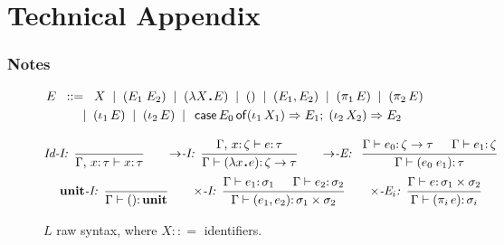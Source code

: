 \documentclass[envcountsame]{llncs}
\newcommand{\key}[1]{\ensuremath{\mathop{\mathsf{#1}}\nolimits}\xspace}
\newcommand{\Case}{\key{case}}
\newcommand{\Of}{\key{of}}
\newcommand{\Unit}{\ensuremath{\mathbf{unit}}\xspace}
\newcommand{\inj}{\mathop{\iota}\nolimits}
\newcommand{\proj}{\mathop{\pi}\nolimits}
\newcommand{\entails}{\vdash}
\newcommand{\sqdot}{\rule{0.5mm}{0.5mm}}
\newcommand{\lam}[1]{\lambda #1\,\sqdot\,}
\newcommand{\is}{\ensuremath{\mathrel{\mathrel{:}\mathrel{:}=}}}
\newcommand{\synsep}{\;\;|\;\;}
\newcommand{\of}{\colon}
\renewcommand{\colon}{\mathpunct{:}}
\newcommand{\Quad}[1]{\hspace*{#1em}}
\newcommand{\irule}[2]{\ensuremath{{\frac{\strut\textstyle #1}{\strut\textstyle #2}}}}
\newcommand{\rulelabel}[1]{\hbox{\it #1:}\Quad{0.5}}
\begin{document}
\newpage
\appendix
\section*{Technical Appendix}

\setcounter{figure}{0}
\renewcommand{\thefigure}{A.\arabic{figure}}
\setcounter{theorem}{0}
\renewcommand{\thetheorem}{A.\arabic{theorem}}
\setcounter{lemma}{0}
\renewcommand{\thelemma}{A.\arabic{lemma}}



\subsubsection{Notes}

\begin{figure}[t]
\begin{minipage}{\textwidth}\small
\begin{align*}
  E \;\;&\is\;\; 
        X
        \synsep (E_1 \; E_2)
        \synsep (\lam{X}E)
	    \synsep ()
        \synsep (E_1,E_2)
        \synsep (\proj_1 E)
        \synsep (\proj_2 E)
		\\
        &
        \Quad1
        \synsep (\inj_1 E)
        \synsep (\inj_2 E)
        \synsep \Case E_0  \Of  
        (\inj_1 X_1) \Rightarrow E_1 ;\;
        (\inj_2 X_2) \Rightarrow E_2
\end{align*}
\caption{$L$ raw syntax, where $X\is$ identifiers.}\label{fig:core:syn}
\end{minipage}
\begin{minipage}{\textwidth}\small
\begin{gather*}
    \rulelabel{Id-I}
    \irule{ }{\Gamma,\,x\of\tau\entails x\of\tau} 
\Quad{2}
    \rulelabel{$\to$-I}
    \irule{ \Gamma,\,x\of\zeta\entails e\of\tau}{
        \Gamma\entails (\lam{x} e) \of\zeta\to\tau} 
\Quad{2}
    \rulelabel{$\to$-E}\;
    \irule{ \Gamma\entails e_0\of\zeta\to\tau 
                \Quad{1.5}
        			\Gamma\entails e_1\of\zeta}{
                \Gamma\entails (e_0\;e_1)\of \tau}
	\\[0ex] \rulelabel{$\Unit$-I}
   \irule{}{\Gamma\entails () \of \Unit}
	\Quad{2}
    \rulelabel{$\times$-I}
    \irule{ 
	            \Gamma\entails e_1\of\sigma_1
	            \Quad{1.5}
	            \Gamma\entails e_2\of\sigma_2}{
                \Gamma\entails (e_1,e_2)
                \of\sigma_1\times\sigma_2} 
\Quad{2}
    \rulelabel{$\times$-E$_i$}
    \irule{ 
	            \Gamma\entails e\of\sigma_{1}\times\sigma_2}{
                \Gamma\entails (\proj_i e)\of\sigma_i} 

\end{gather*}
\end{minipage}
\end{figure}
\end{document}
